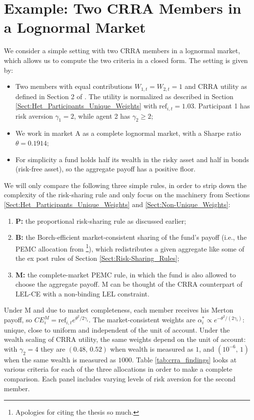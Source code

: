 \section{Example: Two CRRA Members in a Lognormal Market}
\label{Sect:Example}
We consider a simple setting with two CRRA members in a lognormal market, which allows us to compute the two criteria in a closed form. The setting is given by:
\begin{itemize}
    \item Two members with equal contributions $W_{1,t} = W_{2,t} = 1$ and CRRA utility as defined in Section 2 of \citet{Hlebarov_2026_MSc_Thesis}. The utility is normalized as described in Section \ref{Sect:Het_Participants_Unique_Weights} with $\text{ref}_{i,t} = 1.03$. Participant 1 has risk aversion $\gamma_1 = 2$, while agent 2 has $\gamma_2 \geq 2$;
    \item We work in market A as a complete lognormal market, with a Sharpe ratio $\theta = 0.1914$;
    \item For simplicity a fund holds half its wealth in the risky asset and half in bonds (risk-free asset), so the aggregate payoff has a positive floor.
\end{itemize}
We will only compare the following three simple rules, in order to strip down the complexity of the risk-sharing rule and only focus on the machinery from Sections \ref{Sect:Het_Participants_Unique_Weights} and \ref{Sect:Non-Unique_Weights}:
\begin{enumerate}
    \item \textbf{P:} the proportional risk-sharing rule as discussed earlier;
    \item \textbf{B:} the Borch-efficient market-consistent sharing of the fund's payoff (i.e., the PEMC allocation from \citet{Hlebarov_2026_MSc_Thesis}\footnote{Apologies for citing the thesis so much.}), which redistributes a given aggregate like some of the ex post rules of Section \ref{Sect:Risk-Sharing_Rules};
    \item \textbf{M:} the complete-market PEMC rule, in which the fund is also allowed to choose the aggregate payoff. M can be thought of the CRRA counterpart of LEL-CE with a non-binding LEL constraint.
\end{enumerate}
Under M and due to market completeness, each member receives his Merton payoff, so $CE_i^M = \text{ref}_{i,t} e^{\theta^2/2\gamma_i}$. The market-consistent weights are $\alpha^*_i\propto e^{-\theta^2/(2\gamma_i)}$: unique, close to uniform and independent of the unit of account. Under the wealth scaling of CRRA utility, the same weights depend on the unit of account: with $\gamma_2=4$ they are $(0.48,\,0.52)$ when wealth is measured as $1$, and $(10^{-6},\,1)$ when the same wealth is measured as $1000$. Table \ref{tab:crra_findings} looks at various criteria for each of the three allocations in order to make a complete comparison. Each panel includes varying levels of risk aversion for the second member.
